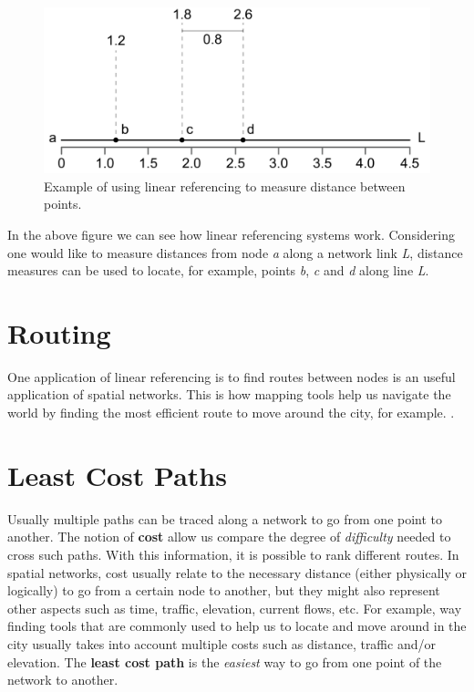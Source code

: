 \documentclass[
]{book}
\begin{document}
\begin{figure}
\includegraphics[width=0.8\linewidth]{images/08-linear_referencing} \caption{Example of using linear referencing to measure distance between points.}\label{fig:8-lienar-referencing}
\end{figure}

In the above figure we can see how linear referencing systems work. Considering one would like to measure distances from node \emph{a} along a network link \emph{L}, distance measures can be used to locate, for example, points \emph{b}, \emph{c} and \emph{d} along line \emph{L}.

\hypertarget{routing}{%
\section{Routing}\label{routing}}

One application of linear referencing is to find routes between nodes is an useful application of spatial networks. This is how mapping tools help us navigate the world by finding the most efficient route to move around the city, for example. \citep{systems_innovation_network_2015}.

\hypertarget{least-cost-paths}{%
\section{Least Cost Paths}\label{least-cost-paths}}

Usually multiple paths can be traced along a network to go from one point to another. The notion of \textbf{cost} allow us compare the degree of \emph{difficulty} needed to cross such paths. With this information, it is possible to rank different routes. In spatial networks, cost usually relate to the necessary distance (either physically or logically) to go from a certain node to another, but they might also represent other aspects such as time, traffic, elevation, current flows, etc. For example, way finding tools that are commonly used to help us to locate and move around in the city usually takes into account multiple costs such as distance, traffic and/or elevation. The \textbf{least cost path} is the \emph{easiest} way to go from one point of the network to another.
\end{document}
